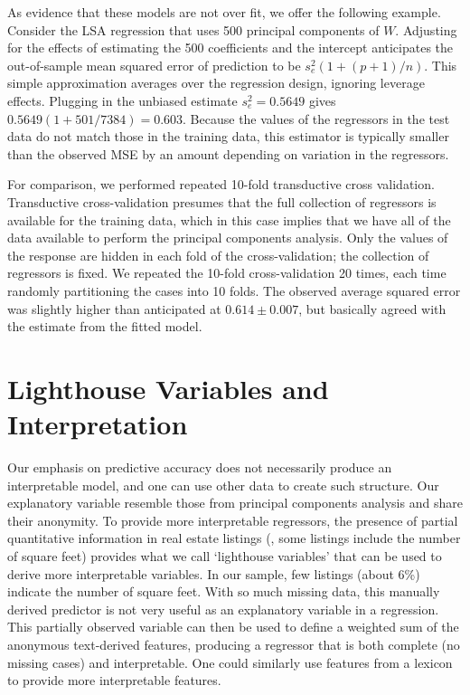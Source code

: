 \documentclass[12pt]{article}
\begin{document}
As evidence that these models are not over fit, we offer the following example.  Consider the LSA regression that uses 500 principal components of $W$.  Adjusting for the effects of estimating the 500 coefficients and the intercept anticipates the out-of-sample mean squared error of prediction to be $s_e^2 (1+(p+1)/n)$.  This simple approximation averages over the regression design, ignoring leverage effects.  Plugging in the unbiased estimate $s_e^2 = 0.5649$ gives $0.5649 (1+501/7384) = 0.603$.  Because the values of the regressors in the test data do not match those in the training data, this estimator is typically smaller than the observed MSE by an amount depending on variation in the regressors.  

For comparison, we performed repeated 10-fold transductive cross validation.  Transductive cross-validation presumes that the full collection of regressors is available for the training data, which in this case implies that we have all of the data available to perform the principal components analysis.  Only the values of the response are hidden in each fold of the cross-validation; the collection of regressors is fixed.  We repeated the 10-fold cross-validation 20 times, each time randomly partitioning the cases into 10 folds. The observed average squared error was slightly higher than anticipated at $0.614 \pm 0.007$, but basically agreed with the estimate from the fitted model. 


\section{Lighthouse Variables and Interpretation}
\label{sec:light}
 
 

 Our emphasis on predictive accuracy does not necessarily produce an
 interpretable model, and one can use other data to create such structure.  Our
 explanatory variable resemble those from principal components analysis and
 share their anonymity.  To provide more interpretable regressors, the presence
 of partial quantitative information in real estate listings (\eg, some listings
 include the number of square feet) provides what we call ‘lighthouse variables’
 that can be used to derive more interpretable variables.  In our sample, few
 listings (about 6\%) indicate the number of square feet.  With so much missing
 data, this manually derived predictor is not very useful as an explanatory
 variable in a regression.  This partially observed variable can then be used to
 define a weighted sum of the anonymous text-derived features, producing a
 regressor that is both complete (no missing cases) and interpretable.  One
 could similarly use features from a lexicon to provide more interpretable
 features.
\end{document}
